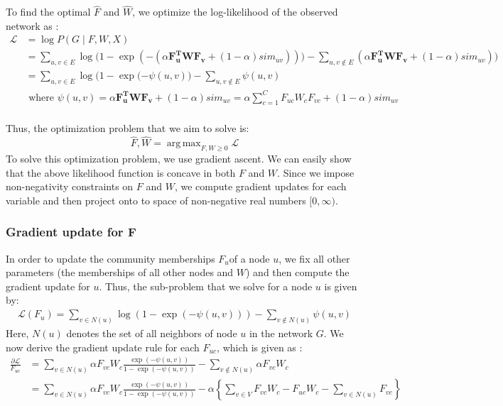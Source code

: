 \documentclass[11pt]{article}
\DeclareMathOperator*{\argmax}{arg\,max}
\begin{document}
To find the optimal $\hat{F}$ and $\hat{W}$,  we optimize the log-likelihood of the observed network as : 
\begin{align*}
 \mathcal{L}  &= \log P(G \mid F, W, X)  \\
 &= \sum\limits_{u,v \in E} \log \Big( 1 - \exp( - ( \alpha \mathbf{F_u^{T}} \mathbf{W} \mathbf{F_v} + (1 - \alpha) sim_{uv})) \Big) - \sum\limits_{u, v \notin E} ( \alpha \mathbf{F_u^{T}} \mathbf{W} \mathbf{F_v} + (1 - \alpha) sim_{uv})) \\
&= \sum\limits_{u,v \in E} \log \Big( 1 - \exp( - \psi(u,v) \Big) - \sum\limits_{u, v \notin E} \psi(u,v) \\[4pt]
& \text{ where }  \psi(u,v) =  \alpha \mathbf{F_u^{T}} \mathbf{W} \mathbf{F_v} + (1 - \alpha) sim_{uv} = \alpha \sum\limits_{c=1}^C F_{uc} W_c F_{vc} + (1 - \alpha) sim_{uv}\\
\end{align*}


Thus, the optimization problem that we aim to solve is: 
\[ \hat{F}, \hat{W} = \argmax_{F, W \geq 0} \mathcal{L} \]
To solve this optimization problem, we use gradient ascent. We can easily show that the above likelihood function is concave in both $F$ and $W$. Since we impose non-negativity constraints on $F$ and $W$, we compute gradient updates for each variable and then project onto to space of non-negative real numbers $[0, \infty)$. \\
  
\subsubsection*{Gradient update for F}
In order to update the community memberships $F_u $of a node $u$, we fix all other parameters (the memberships of all other nodes and $W$) and then compute the gradient update for $u$. Thus, the sub-problem that we solve for a node $u$ is given by: 
\begin{align*}
\mathcal{L} (F_u) = \sum\limits_{v \in N(u)} \log (1 - \exp(- \psi(u,v)))  - \sum\limits_{v \notin N(u)} \psi(u,v)
\end{align*}
Here, $N(u)$ denotes the set of all neighbors of node $u$ in the network $G$.
We now derive the gradient update rule for each $F_{uc}$, which is given as : 
\begin{align*}
\frac{\partial \mathcal{L}}{F_{uc}} &= \sum\limits_{v \in N(u) } \alpha F_{vc} W_c \frac{\exp(- \psi(u,v))}{1 - \exp(-\psi(u,v))} - \sum\limits_{v \notin N(u)} \alpha F_{vc} W_c  \\ 
&= \sum\limits_{v \in N(u) } \alpha F_{vc} W_c \frac{\exp(- \psi(u,v))}{1 - \exp(-\psi(u,v))}  - \alpha \left\lbrace \sum\limits_{v \in V} F_{vc} W_c - F_{uc} W_c - \sum\limits_{v \in N(u)} F_{vc} \right\rbrace
\end{align*}
\end{document}
